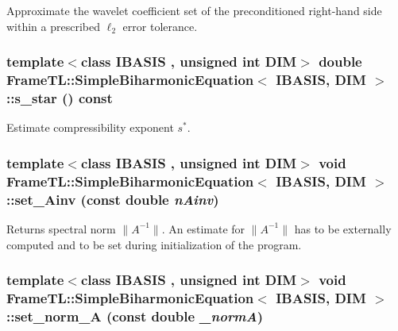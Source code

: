 Approximate the wavelet coefficient set of the preconditioned right-hand side within a prescribed $\ell_2$ error tolerance. \hypertarget{classFrameTL_1_1SimpleBiharmonicEquation_1948f60a5da7ba5f9d1737817741ca6a}{
\subsubsection[{s\_\-star}]{\setlength{\rightskip}{0pt plus 5cm}template$<$class IBASIS , unsigned int DIM$>$ double {\bf FrameTL::SimpleBiharmonicEquation}$<$ IBASIS, DIM $>$::s\_\-star () const}}
\label{classFrameTL_1_1SimpleBiharmonicEquation_1948f60a5da7ba5f9d1737817741ca6a}


Estimate compressibility exponent $s^\ast$. \hypertarget{classFrameTL_1_1SimpleBiharmonicEquation_5b4d7267cb0773deeef602164671aec8}{
\subsubsection[{set\_\-Ainv}]{\setlength{\rightskip}{0pt plus 5cm}template$<$class IBASIS , unsigned int DIM$>$ void {\bf FrameTL::SimpleBiharmonicEquation}$<$ IBASIS, DIM $>$::set\_\-Ainv (const double {\em nAinv})}}
\label{classFrameTL_1_1SimpleBiharmonicEquation_5b4d7267cb0773deeef602164671aec8}


Returns spectral norm $\|A^{-1}\|$. An estimate for $\|A^{-1}\|$ has to be externally computed and to be set during initialization of the program. \hypertarget{classFrameTL_1_1SimpleBiharmonicEquation_23b65b1275ee7a30d046306fe45cf565}{
\subsubsection[{set\_\-norm\_\-A}]{\setlength{\rightskip}{0pt plus 5cm}template$<$class IBASIS , unsigned int DIM$>$ void {\bf FrameTL::SimpleBiharmonicEquation}$<$ IBASIS, DIM $>$::set\_\-norm\_\-A (const double {\em \_\-normA})}}
\label{classFrameTL_1_1SimpleBiharmonicEquation_23b65b1275ee7a30d046306fe45cf565}


